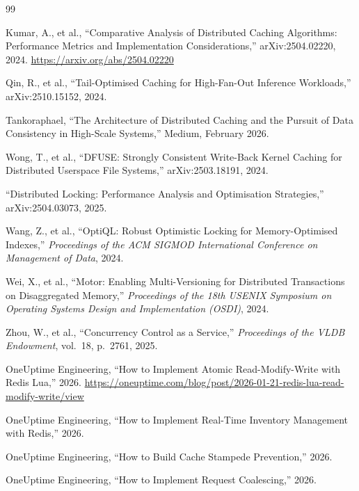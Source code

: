 \documentclass[12pt,a4paper,oneside]{report}
\begin{document}
\begin{thebibliography}{99}

Kumar, A., et al.,
``Comparative Analysis of Distributed Caching Algorithms: Performance Metrics and Implementation Considerations,''
arXiv:2504.02220, 2024.
\url{https://arxiv.org/abs/2504.02220}

Qin, R., et al.,
``Tail-Optimised Caching for High-Fan-Out Inference Workloads,''
arXiv:2510.15152, 2024.

Tankoraphael,
``The Architecture of Distributed Caching and the Pursuit of Data Consistency in High-Scale Systems,''
Medium, February 2026.

Wong, T., et al.,
``DFUSE: Strongly Consistent Write-Back Kernel Caching for Distributed Userspace File Systems,''
arXiv:2503.18191, 2024.

``Distributed Locking: Performance Analysis and Optimisation Strategies,''
arXiv:2504.03073, 2025.

Wang, Z., et al.,
``OptiQL: Robust Optimistic Locking for Memory-Optimised Indexes,''
\textit{Proceedings of the ACM SIGMOD International Conference on Management of Data}, 2024.

Wei, X., et al.,
``Motor: Enabling Multi-Versioning for Distributed Transactions on Disaggregated Memory,''
\textit{Proceedings of the 18th USENIX Symposium on Operating Systems Design and Implementation (OSDI)}, 2024.

Zhou, W., et al.,
``Concurrency Control as a Service,''
\textit{Proceedings of the VLDB Endowment}, vol.\ 18, p.\ 2761, 2025.

OneUptime Engineering,
``How to Implement Atomic Read-Modify-Write with Redis Lua,''
2026. \url{https://oneuptime.com/blog/post/2026-01-21-redis-lua-read-modify-write/view}

OneUptime Engineering,
``How to Implement Real-Time Inventory Management with Redis,''
2026.

OneUptime Engineering,
``How to Build Cache Stampede Prevention,''
2026.

OneUptime Engineering,
``How to Implement Request Coalescing,''
2026.


\end{thebibliography}
\end{document}
